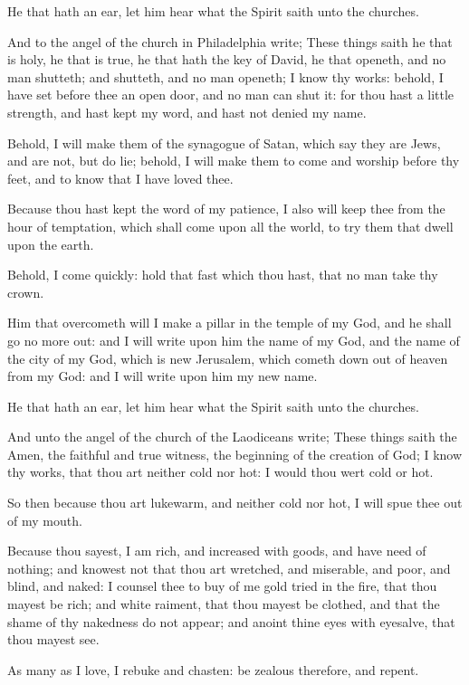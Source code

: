\verse He that hath an ear, let him hear what the Spirit saith unto the churches.

\verse And to the angel of the church in Philadelphia write; These things saith he that is holy, he that is true, he that hath the key of David, he that openeth, and no man shutteth; and shutteth, and no man openeth; \verse I know thy works: behold, I have set before thee an open door, and no man can shut it: for thou hast a little strength, and hast kept my word, and hast not denied my name.

\verse Behold, I will make them of the synagogue of Satan, which say they are Jews, and are not, but do lie; behold, I will make them to come and worship before thy feet, and to know that I have loved thee.

\verse Because thou hast kept the word of my patience, I also will keep thee from the hour of temptation, which shall come upon all the world, to try them that dwell upon the earth.

\verse Behold, I come quickly: hold that fast which thou hast, that no man take thy crown.

\verse Him that overcometh will I make a pillar in the temple of my God, and he shall go no more out: and I will write upon him the name of my God, and the name of the city of my God, which is new Jerusalem, which cometh down out of heaven from my God: and I will write upon him my new name.

\verse He that hath an ear, let him hear what the Spirit saith unto the churches.

\verse And unto the angel of the church of the Laodiceans write; These things saith the Amen, the faithful and true witness, the beginning of the creation of God; \verse I know thy works, that thou art neither cold nor hot: I would thou wert cold or hot.

\verse So then because thou art lukewarm, and neither cold nor hot, I will spue thee out of my mouth.

\verse Because thou sayest, I am rich, and increased with goods, and have need of nothing; and knowest not that thou art wretched, and miserable, and poor, and blind, and naked: \verse I counsel thee to buy of me gold tried in the fire, that thou mayest be rich; and white raiment, that thou mayest be clothed, and that the shame of thy nakedness do not appear; and anoint thine eyes with eyesalve, that thou mayest see.

\verse As many as I love, I rebuke and chasten: be zealous therefore, and repent.

